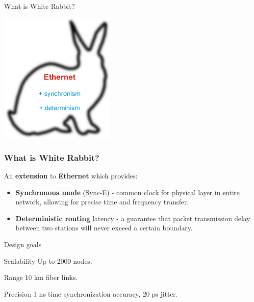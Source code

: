 \documentclass[xcolor=dvipsnames]{beamer}
\begin{document}
\begin{frame}{What is White Rabbit?}
\begin{center}
\includegraphics[height=6.5cm]{misc/rabbit.pdf}
\end{center}
\end{frame}

\frame
{
  \frametitle{What is White Rabbit?}

\begin{block}{}
  An \textbf{extension} to \textbf{Ethernet} which provides:
  \begin{itemize}
  \item \textbf{Synchronous mode} (Sync-E) - common clock for physical layer in entire network, allowing for precise time and frequency transfer.

\item \textbf{Deterministic routing} latency - a guarantee that packet transmission delay between two stations will never exceed a certain boundary.
\end{itemize}
\end{block}

}

\begin{frame}{Design goals}
\begin{block}{Scalability}
Up to 2000 nodes.
\end{block}

\begin{block}{Range}
10 km fiber links.
\end{block}

\begin{block}{Precision}
1 ns time synchronization accuracy, 20 ps jitter.
\end{block}

\end{frame}
\end{document}
